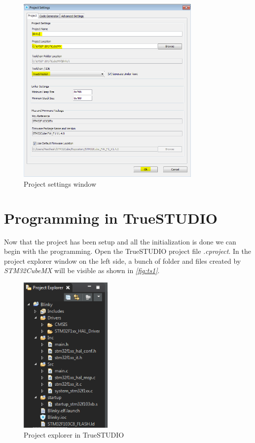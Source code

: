 \documentclass[a4paper,12pt,oneside]{book}
\begin{document}
\begin{figure}[!htb]
\centering
\includegraphics[width=0.8\textwidth]{images/cubemx_5}
\caption{Project settings window}
\label{fig:cube4}
\end{figure}

\section{Programming in TrueSTUDIO}
Now that the project has been setup and all the initialization is done we can begin with the programming. Open the TrueSTUDIO project file \textit{.cproject}. In the project explorer window on the left side, a bunch of folder and files created by \textit{STM32CubeMX} will be visible as shown in \textit{\autoref{fig:ts1}}.\\

\begin{figure}[!htb]
\centering
\includegraphics[width=0.4\textwidth]{images/project_tree}
\caption{Project explorer in TrueSTUDIO}
\label{fig:ts1}
\end{figure}
\end{document}
